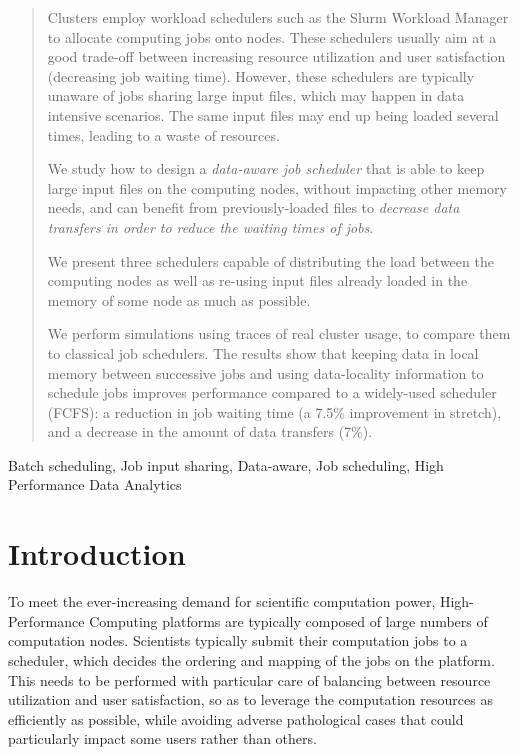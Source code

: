 \documentclass[conference]{IEEEtran}
\begin{document}
\begin{abstract}
  Clusters employ workload schedulers such as
  the Slurm Workload Manager to allocate computing jobs onto
  nodes. These schedulers usually aim at a good trade-off between
  increasing resource utilization and user satisfaction (decreasing
  job waiting time). However, these schedulers are typically unaware
  of jobs sharing large input files, which may happen in data
  intensive scenarios. The same input files may end up being loaded several
  times, leading to a waste of resources.
   
  We study how to design a \textit{data-aware job scheduler} that is
  able to keep large input files on the computing nodes, without
  impacting other memory needs, and can benefit from previously-loaded files to
  \textit{decrease data transfers in order to reduce the waiting times of jobs}.

  We present three schedulers capable of distributing the load between
  the computing nodes as well as re-using input files already loaded
  in the memory of some node as much as possible.
  
  We perform simulations using traces of real cluster usage, to compare
  them to classical job schedulers. The results show that
  keeping data in local memory between successive jobs and using data-locality
  information to schedule jobs improves performance compared
  to a widely-used scheduler (FCFS): a reduction in job waiting time
  (a 7.5\% improvement in stretch), and a decrease in the
  amount of data transfers (7\%).
\end{abstract}

\begin{IEEEkeywords}
Batch scheduling,
Job input sharing,
Data-aware,
Job scheduling,
High Performance Data Analytics
\end{IEEEkeywords}

\section{Introduction}\label{sec.introduction}

To meet the ever-increasing demand for scientific computation power,
High-Performance Computing platforms are typically composed of large
numbers of computation nodes. Scientists typically submit their
computation jobs to a scheduler, which decides the ordering and mapping
of the jobs on the platform. This needs to be performed with particular
care of balancing between resource utilization and user satisfaction, so
as to leverage the computation resources as efficiently as possible,
while avoiding adverse pathological cases that could particularly impact
some users rather than others.
\end{document}
